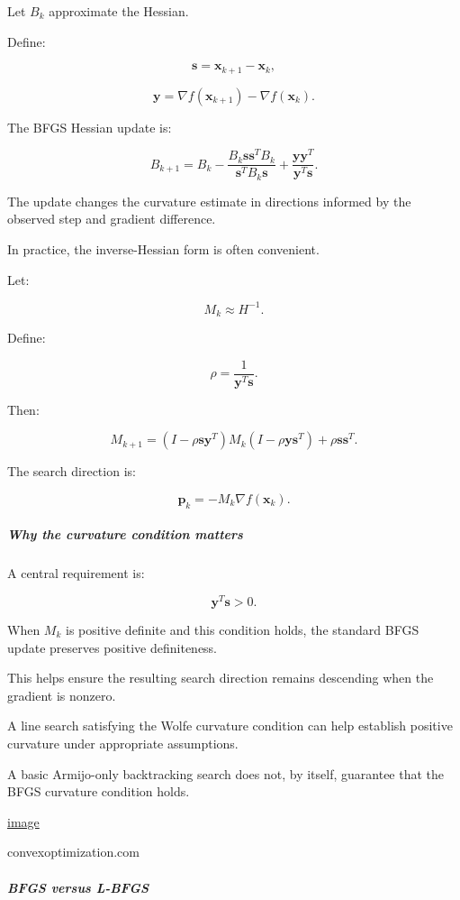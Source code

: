 Let \(B_k\) approximate the Hessian.

Define:

\[
\mathbf s=\mathbf x_{k+1}-\mathbf x_k,
\]

\[
\mathbf y=\nabla f(\mathbf x_{k+1})-\nabla f(\mathbf x_k).
\]

The BFGS Hessian update is:

\[
\boxed{ B_{k+1} = B_k - \frac{B_k\mathbf s\mathbf s^TB_k} {\mathbf s^TB_k\mathbf s} + \frac{\mathbf y\mathbf y^T} {\mathbf y^T\mathbf s} }.
\]

The update changes the curvature estimate in directions informed by the observed step and gradient difference.

In practice, the inverse-Hessian form is often convenient.

Let:

\[
M_k\approx H^{-1}.
\]

Define:

\[
\rho=\frac1{\mathbf y^T\mathbf s}.
\]

Then:

\[
\boxed{ M_{k+1} = (I-\rho\mathbf s\mathbf y^T) M_k (I-\rho\mathbf y\mathbf s^T) + \rho\mathbf s\mathbf s^T }.
\]

The search direction is:

\[
\boxed{ \mathbf p_k=-M_k\nabla f(\mathbf x_k) }.
\]

\subparagraph{Why the curvature condition matters}\label{why-the-curvature-condition-matters}

A central requirement is:

\[
\boxed{\mathbf y^T\mathbf s>0}.
\]

When \(M_k\) is positive definite and this condition holds, the standard BFGS update preserves positive definiteness.

This helps ensure the resulting search direction remains descending when the gradient is nonzero.

A line search satisfying the Wolfe curvature condition can help establish positive curvature under appropriate assumptions.

A basic Armijo-only backtracking search does not, by itself, guarantee that the BFGS curvature condition holds. 

\href{https://www.google.com/s2/favicons?domain=https://convexoptimization.com&sz=32}{image}

convexoptimization.com

\subparagraph{BFGS versus L-BFGS}\label{bfgs-versus-l-bfgs}

